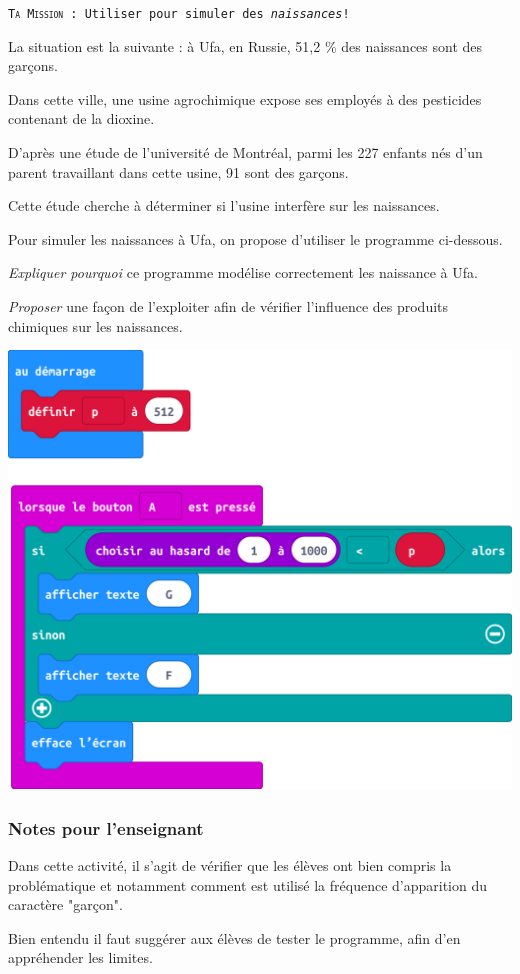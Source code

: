 \begin{eleve}    
    \texttt{\textsc{Ta Mission} : Utiliser \mb pour simuler des \emph{naissances}!}
    
    La situation est la suivante : à Ufa, en Russie, 51,2 \%  des naissances sont des garçons.
    
    Dans cette ville, une usine agrochimique expose ses employés à des pesticides contenant de la dioxine.
    
    D’après une étude de l’université de Montréal, parmi les 227 enfants nés d’un parent travaillant dans cette usine, 91 sont des garçons.
    
    Cette étude cherche à déterminer si l’usine interfère sur les naissances.
    
    Pour simuler les naissances à Ufa, on propose d'utiliser le programme ci-dessous.
    
    \emph{Expliquer pourquoi} ce programme modélise correctement les naissance à Ufa.
    
    \emph{Proposer} une façon de l'exploiter afin de vérifier l'influence des produits chimiques sur les naissances.
    
    \includegraphics[width=0.5\linewidth]{res/mb-fluctuation-activite1.png}
    
\end{eleve}



\subsubsection{Notes pour l'enseignant}

%
%
\begin{methode}
Dans cette activité, il s'agit de vérifier que les élèves ont bien compris la problématique et notamment comment est utilisé la fréquence d'apparition du caractère "garçon".

Bien entendu il faut suggérer aux élèves de tester le programme, afin d'en appréhender les limites.
\end{methode}


